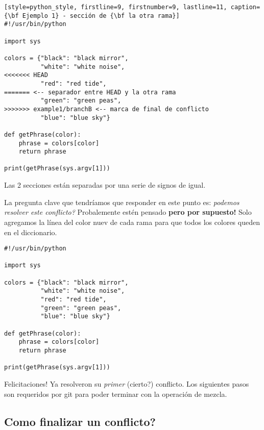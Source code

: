 \begin{lstlisting}[style=python_style, firstline=9, firstnumber=9, lastline=11, caption={\bf Ejemplo 1} - sección de {\bf la otra rama}]
#!/usr/bin/python

import sys

colors = {"black": "black mirror",
          "white": "white noise",
<<<<<<< HEAD
          "red": "red tide",
======= <-- separador entre HEAD y la otra rama
          "green": "green peas",
>>>>>>> example1/branchB <-- marca de final de conflicto
          "blue": "blue sky"}

def getPhrase(color):
    phrase = colors[color]
    return phrase

print(getPhrase(sys.argv[1]))
\end{lstlisting}

Las 2 secciones están separadas por una serie de signos de igual.


La pregunta clave que tendríamos que responder en este punto es: {\it podemos resolver este conflicto?}
Probalemente estén pensado {\bf pero por supuesto!} Solo agregamos la línea del color nuev de cada rama para que todos
los colores queden en el diccionario.

\begin{lstlisting}[style=python_style, caption={\bf Ejemplo 1} - conflicto resuelto]
#!/usr/bin/python

import sys

colors = {"black": "black mirror",
          "white": "white noise",
          "red": "red tide",
          "green": "green peas",
          "blue": "blue sky"}

def getPhrase(color):
    phrase = colors[color]
    return phrase

print(getPhrase(sys.argv[1]))
\end{lstlisting}

Felicitaciones! Ya resolveron su {\it primer} (cierto?) conflicto. Los siguientes pasos son requeridos por git para poder
terminar con la operación de mezcla.

\subsection{Como finalizar un conflicto?}

